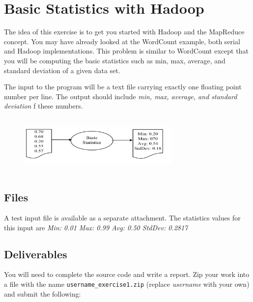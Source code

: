\FILENAME

\section*{Basic Statistics with Hadoop}       

The idea of this exercise is to get you started with Hadoop and the
MapReduce concept. You may have already looked at the WordCount
example, both serial and Hadoop implementations. This problem is
similar to WordCount except that you will be computing the basic
statistics such as min, max, average, and standard deviation of a
given data set.

The input to the program will be a text file carrying exactly one
floating point number per line. The output should include \textit{min,
  max, average, and standard deviation} f these numbers.

\begin{figure}[!htbp]
\includegraphics[width=8cm,height=3cm]{section/icloud/assignment/exercise1/p1example.png}
\centering
\end{figure}

\subsection*{Files}

A test input file is available as a separate attachment.  The
statistics values for this input are \textit{Min: 0.01 Max: 0.99 Avg:
  0.50 StdDev: 0.2817}


\subsection*{Deliverables}

You will need to complete the source code and write a report. Zip your
work into a file with the name \verb|username_exercise1.zip| (replace
\textit{username} with your own) and submit the following:

